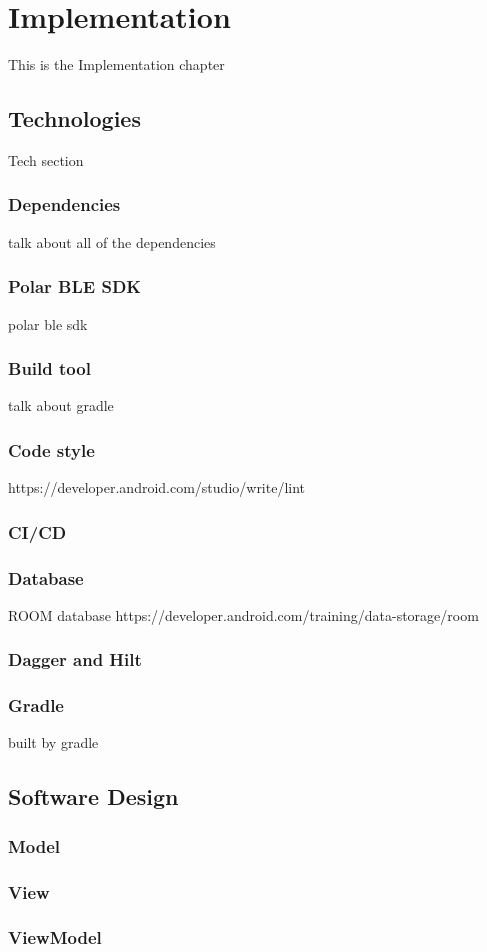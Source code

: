 \chapter{Implementation}

This is the Implementation chapter 

\section{Technologies}
Tech section
\subsection{Dependencies}
talk about all of the dependencies
\subsection{Polar BLE SDK}
polar ble sdk
\subsection{Build tool}
talk about gradle\
\subsection{Code style}
https://developer.android.com/studio/write/lint
\subsection{CI/CD}
\subsection{Database}
ROOM database 
https://developer.android.com/training/data-storage/room
\subsection{Dagger and Hilt}
\subsection{Gradle}
built by gradle

\section{Software Design}
\subsection{Model}
\subsection{View}
\subsection{ViewModel}


